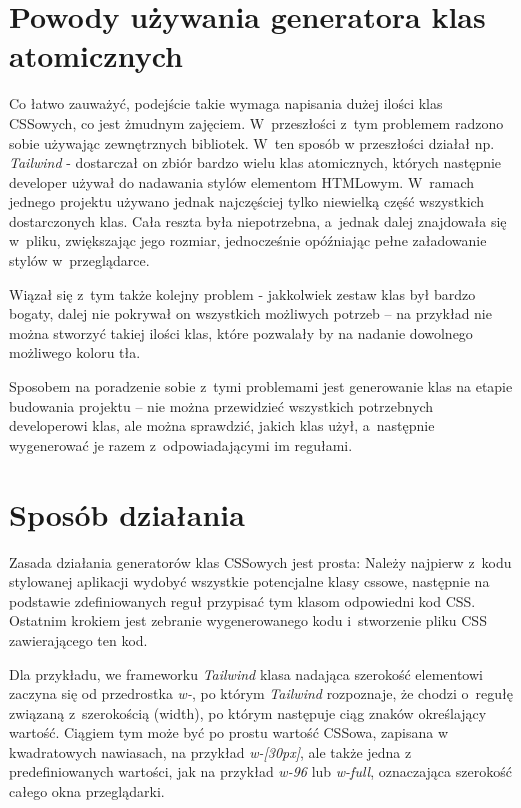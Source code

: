 \documentclass{SGGW-thesis}
\begin{document}
\section{Powody używania generatora klas atomicznych}
Co łatwo zauważyć, podejście takie wymaga napisania dużej ilości klas CSSowych, co jest żmudnym zajęciem. W~przeszłości z~tym problemem radzono sobie używając zewnętrznych bibliotek. W~ten sposób w przeszłości działał np. \emph{Tailwind} - dostarczał on zbiór bardzo wielu klas atomicznych, których następnie developer używał do nadawania stylów elementom HTMLowym. W~ramach jednego projektu używano jednak najczęściej tylko niewielką część wszystkich dostarczonych klas. Cała reszta była niepotrzebna, a~jednak dalej znajdowała się w~pliku, zwiększając jego rozmiar, jednocześnie opóźniając pełne załadowanie stylów w~przeglądarce.

Wiązał się z~tym także kolejny problem - jakkolwiek zestaw klas był bardzo bogaty, dalej nie pokrywał on wszystkich możliwych potrzeb -- na przykład nie można stworzyć takiej ilości klas, które pozwalały by na nadanie dowolnego możliwego koloru tła.

Sposobem na poradzenie sobie z~tymi problemami jest generowanie klas na etapie budowania projektu -- nie można przewidzieć wszystkich potrzebnych developerowi klas, ale można sprawdzić, jakich klas użył, a~następnie wygenerować je razem z~odpowiadającymi im regułami.


\section{Sposób działania}
Zasada działania generatorów klas CSSowych jest prosta: Należy najpierw z~kodu stylowanej aplikacji wydobyć wszystkie potencjalne klasy cssowe, następnie na podstawie zdefiniowanych reguł przypisać tym klasom odpowiedni kod CSS. Ostatnim krokiem jest zebranie wygenerowanego kodu i~stworzenie pliku CSS zawierającego ten kod.

Dla przykładu, we frameworku \emph{Tailwind} klasa nadająca szerokość elementowi zaczyna się od przedrostka \emph{w-}, po którym \emph{Tailwind} rozpoznaje, że chodzi o~regułę związaną z~szerokością (width), po którym następuje ciąg znaków określający wartość. Ciągiem tym może być po prostu wartość CSSowa, zapisana w kwadratowych nawiasach, na przykład \emph{w-[30px]}, ale także jedna z predefiniowanych wartości, jak na przykład \emph{w-96} lub \emph{w-full}, oznaczająca szerokość całego okna przeglądarki\cite{Tailwind_jit}.
\end{document}
